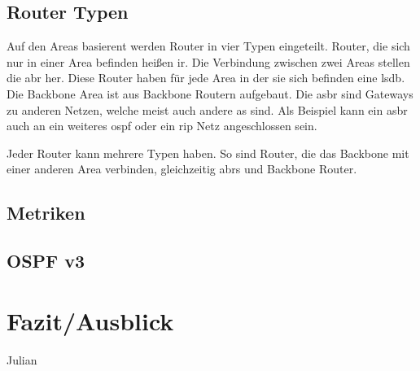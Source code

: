 \documentclass[11pt,a4paper,final]{article}
\begin{document}
\subsection{Router Typen}
Auf den Areas basierent werden Router in vier Typen eingeteilt.
Router, die sich nur in einer Area befinden heißen \ac{ir}.
Die Verbindung zwischen zwei Areas stellen die \ac{abr} her.
Diese Router haben für jede Area in der sie sich befinden eine \ac{lsdb}.
Die Backbone Area ist aus Backbone Routern aufgebaut.
Die \ac{asbr} sind Gateways zu anderen Netzen, welche meist auch andere \ac{as} sind.
Als Beispiel kann ein \ac{asbr} auch an ein weiteres \ac{ospf} oder ein \ac{rip} Netz angeschlossen sein.

Jeder Router kann mehrere Typen haben. So sind Router, die das Backbone mit einer anderen Area verbinden, gleichzeitig \ac{abr}s und Backbone Router.
\subsection{Metriken}
\subsection{OSPF v3}

\section{Fazit/Ausblick}
Julian

\clearpage


\end{document}
